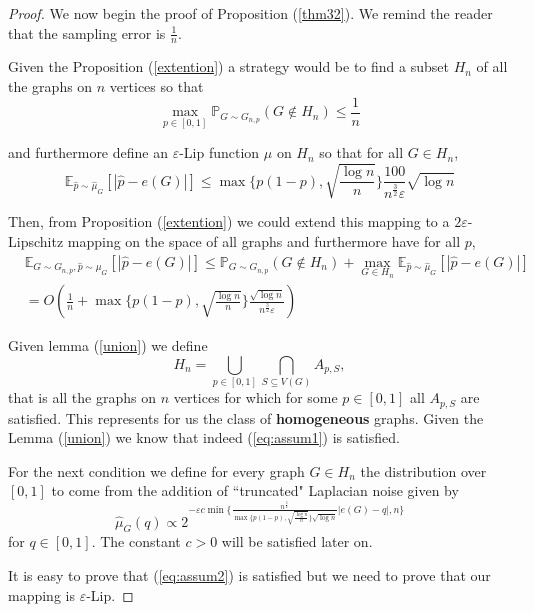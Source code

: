 \documentclass[12pt,a4paper]{article}
\numberwithin{equation}{section}
\numberwithin{equation}{section}
\renewcommand{\epsilon}{\varepsilon}
\newcommand{\1}{{\text{\Large $\mathfrak 1$}}}
\newcommand{\2}[1]{{\text{\Large $\mathfrak 1$}\!\left(#1\right)}}
\begin{document}
\begin{proof}
We now begin the proof of Proposition (\ref{thm32}). We remind the reader that the sampling error is $\frac{1}{n}$.


Given the Proposition (\ref{extention}) a strategy would be to find a subset $H_n$ of all the graphs on $n$ vertices so that
\begin{equation}\label{eq:assum1}
\max_{p \in [0,1]} \mathbb{P}_{G \sim G_{n,p}} \left( G \not \in H_n \right) \leq \frac{1}{n}
\end{equation}

and furthermore define an $\epsilon$-Lip function $\hat{\mu}$ on $H_n$ so that for all $G \in H_n$, 
\begin{equation}\label{eq:assum2}
\mathbb{E}_{\hat{p} \sim \hat{\mu}_G}[|\hat{p}-e(G)|] \leq \max\{p(1-p),\sqrt{\frac{\log n}{n}}\} \frac{100}{n^{\frac{3}{2}} \epsilon} \sqrt{\log n}
\end{equation}

Then, from Proposition (\ref{extention}) we could extend this mapping to a $2\epsilon$-Lipschitz mapping on the space of all graphs and furthermore have for all $p$,
\begin{align*}
&\mathbb{E}_{G \sim G_{n,p},\hat{p} \sim \mu_G}[|\hat{p}-e(G)|]\leq  \mathbb{P}_{G \sim G_{n,p}} \left( G \not \in H_n \right)+\max_{G \in H_n} \mathbb{E}_{\hat{p} \sim \hat{\mu}_G}[|\hat{p}-e(G)|]\\
&=O \left(\frac{1}{n}+\max\{p(1-p),\sqrt{\frac{\log n}{n}}\} \frac{\sqrt{\log n}}{n^{\frac{3}{2}}\epsilon} \right)
\end{align*}

Given lemma (\ref{union}) we define $$H_n=\bigcup_{p \in [0,1]}\bigcap_{S \subseteq V(G)} A_{p,S},$$ that is all the graphs on $n$ vertices for which for some $p \in [0,1]$  all $A_{p,S}$ are satisfied. This represents for us the class of \textbf{homogeneous} graphs. Given the Lemma (\ref{union}) we know that indeed (\ref{eq:assum1}) is satisfied.

For the next condition we define for every graph $G \in H_n$ the distribution over $[0,1]$ to come from the addition of ``truncated" Laplacian noise given by $$\hat{\mu}_G(q) \propto 2^{-\epsilon c \min \{\frac{n^{\frac{3}{2}}}{\max\{p(1-p),\sqrt{\frac{\log n}{n}}\}\sqrt{\log n}} |e(G)-q|,n\}}$$ for $q \in [0,1]$. The constant $c>0$ will be satisfied later on.

It is easy to prove that (\ref{eq:assum2}) is satisfied but we need to prove that our mapping is $\epsilon$-Lip.


\end{proof}
\end{document}
